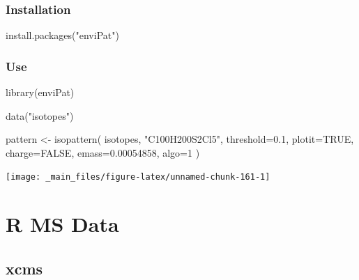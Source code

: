 \documentclass[
]{book}
\newenvironment{Shaded}{\begin{snugshade}}{\end{snugshade}}
\newcommand{\AttributeTok}[1]{\textcolor[rgb]{0.77,0.63,0.00}{#1}}
\newcommand{\ConstantTok}[1]{\textcolor[rgb]{0.00,0.00,0.00}{#1}}
\newcommand{\DecValTok}[1]{\textcolor[rgb]{0.00,0.00,0.81}{#1}}
\newcommand{\FloatTok}[1]{\textcolor[rgb]{0.00,0.00,0.81}{#1}}
\newcommand{\FunctionTok}[1]{\textcolor[rgb]{0.00,0.00,0.00}{#1}}
\newcommand{\NormalTok}[1]{#1}
\newcommand{\OtherTok}[1]{\textcolor[rgb]{0.56,0.35,0.01}{#1}}
\newcommand{\StringTok}[1]{\textcolor[rgb]{0.31,0.60,0.02}{#1}}
\begin{document}
\hypertarget{installation-2}{%
\subsubsection*{Installation}\label{installation-2}}

\begin{Shaded}
\begin{Highlighting}[]
\FunctionTok{install.packages}\NormalTok{(}\StringTok{"enviPat"}\NormalTok{)}
\end{Highlighting}
\end{Shaded}

\hypertarget{use-1}{%
\subsubsection*{Use}\label{use-1}}

\begin{Shaded}
\begin{Highlighting}[]
\FunctionTok{library}\NormalTok{(enviPat)}

\FunctionTok{data}\NormalTok{(}\StringTok{"isotopes"}\NormalTok{)}

\NormalTok{pattern }\OtherTok{\textless{}{-}} \FunctionTok{isopattern}\NormalTok{(}
\NormalTok{  isotopes,}
  \StringTok{"C100H200S2Cl5"}\NormalTok{,}
  \AttributeTok{threshold=}\FloatTok{0.1}\NormalTok{,}
  \AttributeTok{plotit=}\ConstantTok{TRUE}\NormalTok{,}
  \AttributeTok{charge=}\ConstantTok{FALSE}\NormalTok{,}
  \AttributeTok{emass=}\FloatTok{0.00054858}\NormalTok{,}
  \AttributeTok{algo=}\DecValTok{1}
\NormalTok{)}
\end{Highlighting}
\end{Shaded}

\begin{center}\texttt{[image: \_main\_files/figure-latex/unnamed-chunk-161-1]} \end{center}

\hypertarget{r-ms-data}{%
\section{R MS Data}\label{r-ms-data}}

\hypertarget{xcms}{%
\subsection*{xcms}\label{xcms}}
\end{document}
